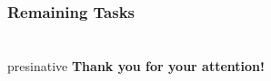 \documentclass[hyperref={pdfpagelabels=false}]{beamer}
\begin{document}
\begin{frame}
    \frametitle{Remaining Tasks}
\end{frame}

\section{}
\begin{frame}
	\hfill
	\begin{beamercolorbox}[shadow=true, rounded=true, wd=10cm]{presinative}
		\centering
		\Large{\textbf{Thank you for your attention!}}
	\end{beamercolorbox}
	\hfill
\end{frame}
\end{document}
